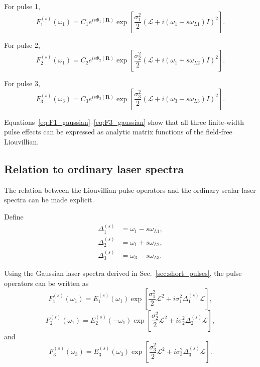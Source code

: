 \documentclass[11pt]{article}
\begin{document}
For pulse 1,
%
\begin{equation}
\boxed{
F_1^{(s)}(\omega_1)
=
C_1
e^{is\Phi_1(\mathbf{R})}
\exp
\left[
\frac{\sigma_1^2}{2}
\left(
\mathcal{L}
+
i(\omega_1-s\omega_{L1})I
\right)^2
\right].
}
\label{eq:F1_gaussian}
\end{equation}

For pulse 2,
%
\begin{equation}
\boxed{
F_2^{(s)}(\omega_1)
=
C_2
e^{is\Phi_2(\mathbf{R})}
\exp
\left[
\frac{\sigma_2^2}{2}
\left(
\mathcal{L}
+
i(\omega_1+s\omega_{L2})I
\right)^2
\right].
}
\label{eq:F2_gaussian}
\end{equation}

For pulse 3,
%
\begin{equation}
\boxed{
F_3^{(s)}(\omega_3)
=
C_3
e^{is\Phi_3(\mathbf{R})}
\exp
\left[
\frac{\sigma_3^2}{2}
\left(
\mathcal{L}
+
i(\omega_3-s\omega_{L3})I
\right)^2
\right].
}
\label{eq:F3_gaussian}
\end{equation}

Equations~\eqref{eq:F1_gaussian}--\eqref{eq:F3_gaussian} show that all
three finite-width pulse effects can be expressed as analytic matrix
functions of the field-free Liouvillian.


\subsection{Relation to ordinary laser spectra}
\label{subsec:F_relation_spectra}

The relation between the Liouvillian pulse operators and the ordinary
scalar laser spectra can be made explicit.

Define
%
\begin{align}
\Delta_1^{(s)}
&=
\omega_1-s\omega_{L1},
\\
\Delta_2^{(s)}
&=
\omega_1+s\omega_{L2},
\\
\Delta_3^{(s)}
&=
\omega_3-s\omega_{L3}.
\end{align}

Using the Gaussian laser spectra derived in
Sec.~\ref{sec:short_pulses}, the pulse operators can be written as
%
\begin{equation}
\boxed{
F_1^{(s)}(\omega_1)
=
E_1^{(s)}(\omega_1)
\exp
\left[
\frac{\sigma_1^2}{2}\mathcal{L}^2
+
i\sigma_1^2
\Delta_1^{(s)}
\mathcal{L}
\right],
}
\label{eq:F1_dressing}
\end{equation}
%
\begin{equation}
\boxed{
F_2^{(s)}(\omega_1)
=
E_2^{(s)}(-\omega_1)
\exp
\left[
\frac{\sigma_2^2}{2}\mathcal{L}^2
+
i\sigma_2^2
\Delta_2^{(s)}
\mathcal{L}
\right],
}
\label{eq:F2_dressing}
\end{equation}
%
and
%
\begin{equation}
\boxed{
F_3^{(s)}(\omega_3)
=
E_3^{(s)}(\omega_3)
\exp
\left[
\frac{\sigma_3^2}{2}\mathcal{L}^2
+
i\sigma_3^2
\Delta_3^{(s)}
\mathcal{L}
\right].
}
\label{eq:F3_dressing}
\end{equation}
\end{document}
